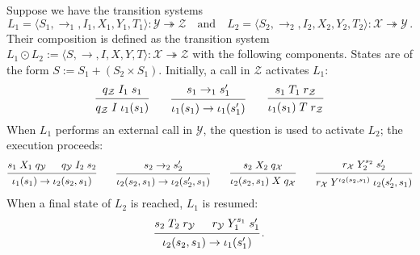 \documentclass[acmsmall,screen,review,anonymous]{acmart}
\begin{document}

\begin{definition} %
Suppose we have the transition systems
\[
  L_1 = \langle S_1, {\rightarrow_1}, I_1, X_1, Y_1, T_1 \rangle
    : \mathcal{Y} \twoheadrightarrow \mathcal{Z}
  \quad \text{and} \quad
  L_2 = \langle S_2, {\rightarrow_2}, I_2, X_2, Y_2, T_2 \rangle
    : \mathcal{X} \twoheadrightarrow \mathcal{Y}
  \,.
\]
Their composition is defined as the transition system
$
  L_1 \odot L_2 :=
  \langle S, {\rightarrow}, I, X, Y, T \rangle
  : \mathcal{X} \twoheadrightarrow \mathcal{Z}
$
with the following components.
States are of the form
$
    S := S_1 + (S_2 \times S_1)
$.
Initially, a call in $\mathcal{Z}$ activates $L_1$:
\[
  \begin{prooftree}
    \hypo{q_\mathcal{Z} \mathrel{I_1} s_1}
    \infer1{q_\mathcal{Z} \mathrel{I} \iota_1(s_1)}
  \end{prooftree}
  \qquad
  \begin{prooftree}
    \hypo{s_1 \rightarrow_1 s_1'}
    \infer1{\iota_1(s_1) \rightarrow \iota_1(s_1')}
  \end{prooftree}
  \qquad
  \begin{prooftree}
    \hypo{s_1 \mathrel{T_1} r_\mathcal{Z}}
    \infer1{\iota_1(s_1) \mathrel{T} r_\mathcal{Z}}
  \end{prooftree}
\]
When $L_1$ performs an external call in $\mathcal{Y}$,
the question is used to activate $L_2$;
the execution proceeds:
\[
  \begin{prooftree}
    \hypo{s_1 \mathrel{X_1} q_\mathcal{Y}}
    \hypo{q_\mathcal{Y} \mathrel{I_2} s_2}
    \infer2{\iota_1(s_1) \rightarrow \iota_2(s_2, s_1)}
  \end{prooftree}
  \qquad
  \begin{prooftree}
    \hypo{s_2 \rightarrow_2 s_2'}
    \infer1{\iota_2(s_2, s_1) \rightarrow \iota_2(s_2', s_1)}
  \end{prooftree}
  \qquad
  \begin{prooftree}
    \hypo{s_2 \mathrel{X_2} q_\mathcal{X}}
    \infer1{\iota_2(s_2, s_1) \mathrel{X} q_\mathcal{X}}
  \end{prooftree}
  \qquad
  \begin{prooftree}
    \hypo{r_\mathcal{X} \mathrel{Y_2^{s_2}} s_2'}
    \infer1{r_\mathcal{X} \mathrel{Y^{\iota_2(s_2, s_1)}} \iota_2(s_2', s_1)}
  \end{prooftree}
\]
When a final state of $L_2$ is reached,
$L_1$ is resumed:
\[
  \begin{prooftree}
    \hypo{s_2 \mathrel{T_2} r_\mathcal{Y}}
    \hypo{r_\mathcal{Y} \mathrel{Y_1^{s_1}} s_1'}
    \infer2{\iota_2(s_2, s_1) \rightarrow \iota_1(s_1')}
  \end{prooftree}
  \,.
\]
\end{definition}
\end{document}
